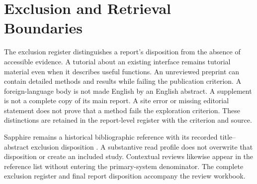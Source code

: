 \documentclass[manuscript,review,screen]{acmart}
\begin{document}
\section{Exclusion and Retrieval Boundaries}\label{app:exclusions}
The exclusion register distinguishes a report's disposition from the absence of accessible evidence. A tutorial about an existing interface remains tutorial material even when it describes useful functions. An unreviewed preprint can contain detailed methods and results while failing the publication criterion. A foreign-language body is not made English by an English abstract. A supplement is not a complete copy of its main report. A site error or missing editorial statement does not prove that a method fails the exploration criterion. These distinctions are retained in the report-level register with the criterion and source.

Sapphire remains a historical bibliographic reference with its recorded title--abstract exclusion disposition \citep{2016_El-Roby_Sapphire_Querying}. A substantive read profile does not overwrite that disposition or create an included study. Contextual reviews likewise appear in the reference list without entering the primary-system denominator. The complete exclusion register and final report disposition accompany the review workbook.
\end{document}
